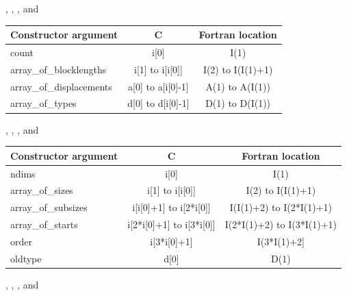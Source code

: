 \begin{description}[style=unboxed,leftmargin=0cm]
\item[\mpiconstmain{MPI\_COMBINER\_STRUCT}]
, , , and

\begin{center}
\begin{tabular}{l c c}
\hline
Constructor argument &          C &                    Fortran location                \\
\hline
count &                         i[0] &                          I(1)                            \\
array\_of\_blocklengths &       i[1] to i[i[0]] &               I(2) to I(I(1)+1)               \\
array\_of\_displacements &      a[0] to a[i[0]-1] &             A(1) to A(I(1))                 \\
array\_of\_types &              d[0] to d[i[0]-1] &             D(1) to D(I(1))                 \\
\hline
\end{tabular}
\end{center}

\item[\mpiconstmain{MPI\_COMBINER\_SUBARRAY}]
, , , and

\begin{center}
\begin{tabular}{l c c}
\hline
Constructor argument &          C &                    Fortran location                \\
\hline
ndims &                         i[0] &                          I(1)                            \\
array\_of\_sizes &              i[1] to i[i[0]] &               I(2) to I(I(1)+1)               \\
array\_of\_subsizes &           i[i[0]+1] to i[2*i[0]] &        I(I(1)+2) to I(2*I(1)+1)        \\
array\_of\_starts &             i[2*i[0]+1] to i[3*i[0]] &      I(2*I(1)+2) to I(3*I(1)+1)      \\
order &                         i[3*i[0]+1] &                   I(3*I(1)+2]                     \\
oldtype &                       d[0] &                          D(1)                            \\
\hline
\end{tabular}
\end{center}

\filbreak %
\item[\mpiconstmain{MPI\_COMBINER\_DARRAY}]
, , , and


\end{description}
